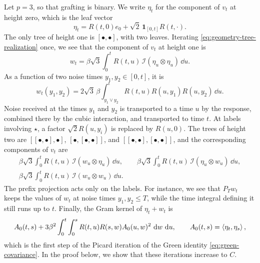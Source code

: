 \begin{example}[The first two heights for $p=3$]\label{ex:tree-first-heights}
Let $p=3$, so that grafting is binary. We write $\eta_t$ for the component of $v_t$ at height zero, which is the leaf vector
\[
 \eta_t=R(t,0)e_0+\sqrt2\,\mathbf 1_{[0,t]}R(t,\cdot).
\]
The only tree of height one is $[\bullet,\bullet]$, with two leaves. Iterating \eqref{eq:geometry-tree-realization} once, we see that the component of $v_t$ at height one is
\[
 w_t=\beta\sqrt3\int_0^tR(t,u)\,\mathcal I(\eta_u\otimes\eta_u)\,\dd u.
\]
As a function of two noise times $y_1,y_2\in[0,t]$, it is
\[
 w_t(y_1,y_2)=2\sqrt3\,\beta\int_{y_1\vee y_2}^tR(t,u)R(u,y_1)R(u,y_2)\,\dd u.
\]
Noise received at the times $y_1$ and $y_2$ is transported to a time $u$ by the response, combined there by the cubic interaction, and transported to time $t$. At labels involving $\star$, a factor $\sqrt2R(u,y_i)$ is replaced by $R(u,0)$. The trees of height two are $[[\bullet,\bullet],\bullet]$, $[\bullet,[\bullet,\bullet]]$, and $[[\bullet,\bullet],[\bullet,\bullet]]$, and the corresponding components of $v_t$ are
\begin{gather*}
 \beta\sqrt3\int_0^tR(t,u)\,\mathcal I(w_u\otimes\eta_u)\,\dd u,\qquad
 \beta\sqrt3\int_0^tR(t,u)\,\mathcal I(\eta_u\otimes w_u)\,\dd u,\\
 \beta\sqrt3\int_0^tR(t,u)\,\mathcal I(w_u\otimes w_u)\,\dd u.
\end{gather*}
The prefix projection acts only on the labels. For instance, we see that $P_Tw_t$ keeps the values of $w_t$ at noise times $y_1,y_2\le T$, while the time integral defining it still runs up to $t$. Finally, the Gram kernel of $\eta_t+w_t$ is
\[
 A_0(t,s)+3\beta^2\int_0^t\int_0^sR(t,u)R(s,w)A_0(u,w)^2\,\mathop{}\!\mathrm d w\,\mathop{}\!\mathrm d u,
 \qquad A_0(t,s)=\left\langle\eta_t,\eta_s\right\rangle,
\]
which is the first step of the Picard iteration of the Green identity \eqref{eq:green-covariance}. In the proof below, we show that these iterations increase to $C$.
\end{example}

